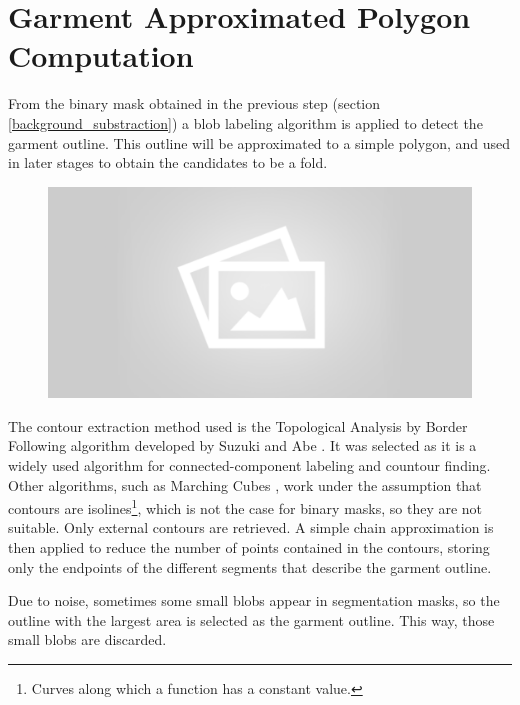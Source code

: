 \section{Garment Approximated Polygon Computation}
From the binary mask obtained in the previous step (section \ref{background_substraction}) a blob labeling algorithm is applied to detect the garment outline. This outline will be approximated to a simple polygon, and used in later stages to obtain the candidates to be a fold.

\begin{figure}[thpb]
    \centering
    \includegraphics[width=0.9
    \textwidth]{figures/placeholder2.png}
    \caption{}
    \label{fig:garment_polygon_processes}
\end{figure}

The contour extraction method used is the Topological Analysis by Border Following algorithm developed by Suzuki and Abe  {}. It was selected as it is a widely used algorithm for connected-component labeling and countour finding. Other algorithms, such as Marching Cubes , work under the assumption that contours are isolines\footnote{Curves along which a  function has a constant value.}, which is not the case for binary masks, so they are not suitable. Only external contours are retrieved. A simple chain approximation is then applied to reduce the number of points contained in the contours, storing only the endpoints of the different segments that describe the garment outline.

Due to noise, sometimes some small blobs appear in segmentation masks, so the outline with the largest area is selected as the garment outline. This way, those small blobs are discarded.

